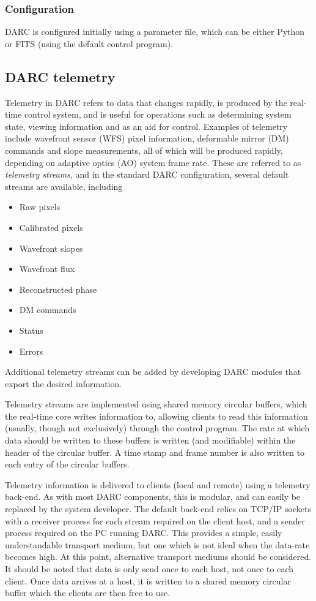 \documentclass[a4,10pt]{article}
\newcommand{\ao}{adaptive optics (AO)\renewcommand{\ao}{AO\xspace}\xspace}
\newcommand{\dm}{deformable mirror (DM)\renewcommand{\dm}{DM\xspace}\xspace}
\newcommand{\wfs}{wavefront sensor (WFS)\renewcommand{\wfs}{WFS\xspace}\xspace}
\begin{document}
\subsubsection{Configuration}
DARC is configured initially using a parameter file, which can be
either Python or FITS (using the default control program).  

\subsection{DARC telemetry}
Telemetry in DARC refers to data that changes rapidly, is produced by
the real-time control system, and is useful for operations such as
determining system state, viewing information and as an aid for
control.  Examples of telemetry include \wfs pixel information, \dm
commands and slope measurements, all of which will be produced
rapidly, depending on \ao system frame rate.  These are referred to as
{\em telemetry streams}, and in the standard DARC configuration,
several default streams are available, including
\begin{itemize}
\item Raw pixels
\item Calibrated pixels
\item Wavefront slopes
\item Wavefront flux
\item Reconstructed phase
\item DM commands
\item Status
\item Errors
\end{itemize}

Additional telemetry streams can be added by developing DARC modules
that export the desired information.

Telemetry streams are implemented using shared memory circular
buffers, which the real-time core writes information to, allowing
clients to read this information (usually, though not exclusively)
through the control program.  The rate at which data should be written
to these buffers is written (and modifiable) within the header of the
circular buffer.  A time stamp and frame number is also written to
each entry of the circular buffers.

Telemetry information is delivered to clients (local and remote) using
a telemetry back-end.  As with most DARC components, this is modular,
and can easily be replaced by the system developer.  The default
back-end relies on TCP/IP sockets with a receiver process for each
stream required on the client host, and a sender process required on
the PC running DARC.  This provides a simple, easily understandable
transport medium, but one which is not ideal when the data-rate
becomes high.  At this point, alternative transport mediums should be
considered.  It should be noted that data is only send once to each
host, not once to each client.  Once data arrives at a host, it is
written to a shared memory circular buffer which the clients are then
free to use.
\end{document}

